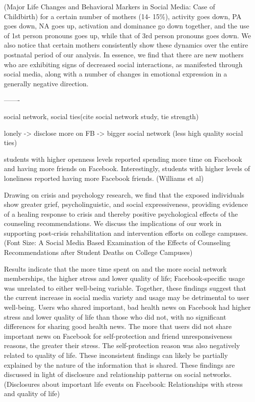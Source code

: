 (Major Life Changes and Behavioral Markers in Social
Media: Case of Childbirth)
for a certain number of mothers (14-
15\%), activity goes down, PA goes down, NA goes up,
activation and dominance go down together, and the use of
1st person pronouns goes up, while that of 3rd person
pronouns goes down. We also notice that certain mothers
consistently show these dynamics over the entire postnatal
period of our analysis. In essence, we find that there are
new mothers who are exhibiting signs of decreased social
interactions, as manifested through social media, along with
a number of changes in emotional expression in a generally
negative direction.



-------

social network, social ties(cite social network study, tie strength)

lonely  -> disclose more on FB -> bigger social network (less high quality social ties)


students with higher openness levels reported spending more time on Facebook and having more friends on Facebook. Interestingly, students with higher levels of loneliness reported having more Facebook friends. (Williams et al)


 Drawing on crisis and psychology research, we find that the exposed individuals show greater grief, psycholinguistic, and social expressiveness, providing evidence of a healing response to crisis and thereby positive psychological effects of the counseling recommendations. We discuss the implications of our work in supporting post-crisis rehabilitation and intervention efforts on college campuses. (Font Size: 
A Social Media Based Examination of the Effects of Counseling Recommendations after Student Deaths on College Campuses)




 Results indicate that the more time spent on and the more social network memberships, the higher stress and lower quality of life; Facebook-specific usage was unrelated to either well-being variable. Together, these findings suggest that the current increase in social media variety and usage may be detrimental to user well-being. Users who shared important, bad health news on Facebook had higher stress and lower quality of life than those who did not, with no significant differences for sharing good health news. The more that users did not share important news on Facebook for self-protection and friend unresponsiveness reasons, the greater their stress. The self-protection reason was also negatively related to quality of life. These inconsistent findings can likely be partially explained by the nature of the information that is shared. These findings are discussed in light of disclosure and relationship patterns on social networks. (Disclosures about important life events on Facebook: Relationships with stress and quality of life)

